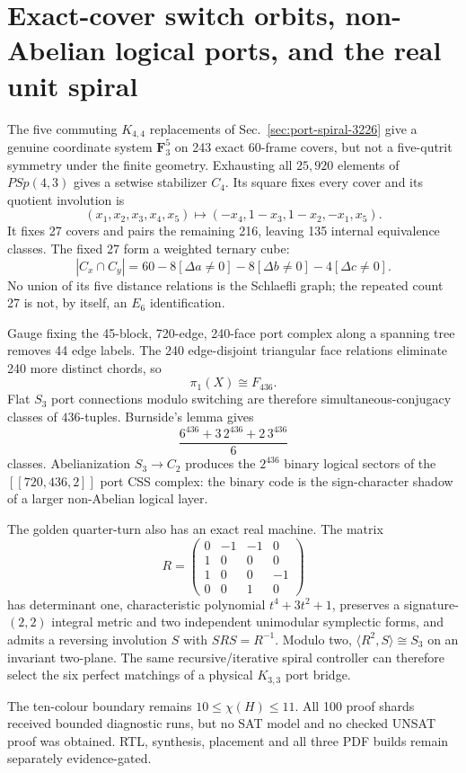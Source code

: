\section{Exact-cover switch orbits, non-Abelian logical ports, and the real unit spiral}
\label{sec:pass3238-3249}

The five commuting $K_{4,4}$ replacements of Sec.~\ref{sec:port-spiral-3226} give a genuine coordinate system $\mathbf F_3^5$ on 243 exact 60-frame covers, but not a five-qutrit symmetry under the finite geometry.  Exhausting all $25{,}920$ elements of $PSp(4,3)$ gives a setwise stabilizer $C_4$.  Its square fixes every cover and its quotient involution is
\[
 (x_1,x_2,x_3,x_4,x_5)\longmapsto(-x_4,1-x_3,1-x_2,-x_1,x_5).
\]
It fixes 27 covers and pairs the remaining 216, leaving 135 internal equivalence classes.  The fixed 27 form a weighted ternary cube:
\[
 |C_x\cap C_y|=60-8[\Delta a\ne0]-8[\Delta b\ne0]-4[\Delta c\ne0].
\]
No union of its five distance relations is the Schlaefli graph; the repeated count 27 is not, by itself, an $E_6$ identification.

Gauge fixing the 45-block, 720-edge, 240-face port complex along a spanning tree removes 44 edge labels.  The 240 edge-disjoint triangular face relations eliminate 240 more distinct chords, so
\[
 \pi_1(X)\cong F_{436}.
\]
Flat $S_3$ port connections modulo switching are therefore simultaneous-conjugacy classes of $436$-tuples.  Burnside's lemma gives
\[
 \frac{6^{436}+3\,2^{436}+2\,3^{436}}6
\]
classes.  Abelianization $S_3\to C_2$ produces the $2^{436}$ binary logical sectors of the $[[720,436,2]]$ port CSS complex: the binary code is the sign-character shadow of a larger non-Abelian logical layer.

The golden quarter-turn also has an exact real machine.  The matrix
\[
 R=\begin{pmatrix}
0&-1&-1&0\\1&0&0&0\\1&0&0&-1\\0&0&1&0
\end{pmatrix}
\]
has determinant one, characteristic polynomial $t^4+3t^2+1$, preserves a signature-$(2,2)$ integral metric and two independent unimodular symplectic forms, and admits a reversing involution $S$ with $SRS=R^{-1}$.  Modulo two, $\langle R^2,S\rangle\cong S_3$ on an invariant two-plane.  The same recursive/iterative spiral controller can therefore select the six perfect matchings of a physical $K_{3,3}$ port bridge.

The ten-colour boundary remains $10\leq\chi(H)\leq11$.  All 100 proof shards received bounded diagnostic runs, but no SAT model and no checked UNSAT proof was obtained.  RTL, synthesis, placement and all three PDF builds remain separately evidence-gated.
